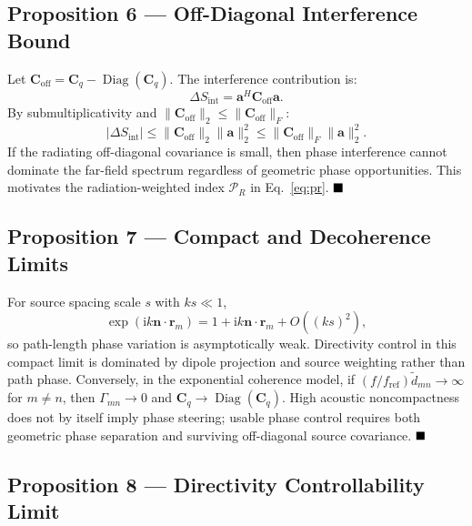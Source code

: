 \documentclass[11pt]{article}
\newcommand{\ii}{\mathrm{i}}
\newcommand{\vect}[1]{\bm{#1}}
\newcommand{\mat}[1]{\bm{#1}}
\begin{document}
\subsection{Proposition 6 --- Off-Diagonal Interference Bound}

Let $\mat{C}_{\mathrm{off}}=\mat{C}_q-\operatorname{Diag}(\mat{C}_q)$. The interference contribution is:
\begin{equation*}
    \Delta S_{\mathrm{int}}
    =
    \vect{a}^{H}\mat{C}_{\mathrm{off}}\vect{a}.
\end{equation*}
By submultiplicativity and $\|\mat{C}_{\mathrm{off}}\|_2\le\|\mat{C}_{\mathrm{off}}\|_F$:
\begin{equation*}
    |\Delta S_{\mathrm{int}}|
    \le
    \|\mat{C}_{\mathrm{off}}\|_2\|\vect{a}\|_2^2
    \le
    \|\mat{C}_{\mathrm{off}}\|_F\|\vect{a}\|_2^2.
\end{equation*}
If the radiating off-diagonal covariance is small, then phase interference cannot dominate the far-field spectrum regardless of geometric phase opportunities. This motivates the radiation-weighted index $\mathcal P_R$ in Eq.~\ref{eq:pr}. $\hfill \blacksquare$

\subsection{Proposition 7 --- Compact and Decoherence Limits}

For source spacing scale $s$ with $ks\ll1$,
\begin{equation*}
    \exp(\ii k\vect{n}\cdot\vect{r}_m)
    =
    1+\ii k\vect{n}\cdot\vect{r}_m+O((ks)^2),
\end{equation*}
so path-length phase variation is asymptotically weak. Directivity control in this compact limit is dominated by dipole projection and source weighting rather than path phase. Conversely, in the exponential coherence model, if $(f/f_{\mathrm{ref}})\tilde d_{mn}\rightarrow\infty$ for $m\neq n$, then $\Gamma_{mn}\rightarrow0$ and $\mat{C}_q\rightarrow\operatorname{Diag}(\mat{C}_q)$. High acoustic noncompactness does not by itself imply phase steering; usable phase control requires both geometric phase separation and surviving off-diagonal source covariance. $\hfill \blacksquare$

\subsection{Proposition 8 --- Directivity Controllability Limit}
\end{document}
